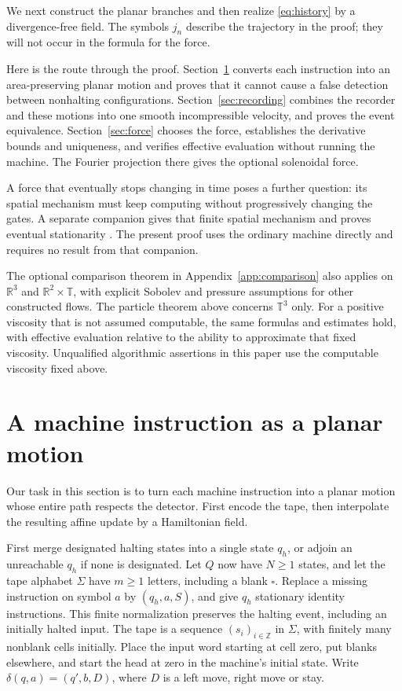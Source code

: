 \documentclass[11pt]{article}
\newcommand{\T}{\mathbb T}
\newcommand{\R}{\mathbb R}
\newcommand{\Z}{\mathbb Z}
\begin{document}
We next construct the planar branches and then realize
\eqref{eq:history} by a divergence-free field. The symbols $j_n$ describe
the trajectory in the proof; they will not occur in the formula for the
force.

Here is the route through the proof. Section~\ref{sec:planar} converts each
instruction into an area-preserving planar motion and proves that it cannot
cause a false detection between nonhalting configurations.
Section~\ref{sec:recording} combines the recorder and these motions into one
smooth incompressible velocity, and proves the event equivalence.
Section~\ref{sec:force} chooses the force, establishes the derivative bounds
and uniqueness, and verifies effective evaluation without running the
machine. The Fourier projection there gives the optional solenoidal force.

A force that eventually stops changing in time poses a further question:
its spatial mechanism must keep computing without progressively changing
the gates. A separate companion gives that finite spatial mechanism
and proves eventual stationarity \cite{Stationary}. The present
proof uses the ordinary machine directly and requires no result
from that companion.

The optional comparison theorem in Appendix~\ref{app:comparison}
also applies on $\R^3$ and $\R^2\times\T$, with explicit Sobolev
and pressure assumptions for other constructed flows. The particle theorem above concerns $\T^3$ only.
For a positive viscosity that is not assumed computable, the same formulas
and estimates hold, with effective evaluation relative to the ability to
approximate that fixed viscosity. Unqualified algorithmic assertions in
this paper use the computable viscosity fixed above.

\section{A machine instruction as a planar motion}\label{sec:planar}

Our task in this section is to turn each machine instruction into a planar
motion whose entire path respects the detector. First encode the tape,
then interpolate the resulting affine update by a Hamiltonian field.

First merge designated halting states into a single state $q_h$, or
adjoin an unreachable $q_h$ if none is designated. Let $Q$ now have
$N\geq1$ states, and let the tape alphabet $\Sigma$ have $m\geq1$
letters, including a blank $\square$. Replace a missing instruction
on symbol $a$ by $(q_h,a,S)$, and give $q_h$ stationary identity
instructions. This finite normalization preserves the halting event,
including an initially halted input. The tape is a sequence $(s_i)_{i\in\Z}$ in $\Sigma$, with finitely many
nonblank cells initially. Place the input word starting at cell zero,
put blanks elsewhere, and start the head at zero in the machine's initial
state. Write
$\delta(q,a)=(q',b,D)$, where $D$ is a left move, right move or stay.
\end{document}
